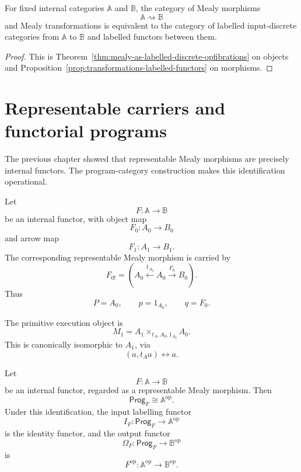 \begin{corollary}
\label{cor:mealy-hom-category-labelled-discrete}
For fixed internal categories \(\mathbb A\) and \(\mathbb B\), the category of Mealy morphisms
\[
\mathbb A\rightsquigarrow\mathbb B
\]
and Mealy transformations is equivalent to the category of labelled input-discrete categories from \(\mathbb A\) to \(\mathbb B\) and labelled functors between them.
\end{corollary}

\begin{proof}
This is Theorem~\ref{thm:mealy-as-labelled-discrete-opfibrations} on objects and Proposition~\ref{prop:transformations-labelled-functors} on morphisms.
\end{proof}

\section{Representable carriers and functorial programs}
\label{sec:representable-carriers-functorial-programs}

The previous chapter showed that representable Mealy morphisms are precisely internal functors. The program-category construction makes this identification operational.

Let
\[
F:\mathbb A\to\mathbb B
\]
be an internal functor, with object map
\[
F_0:A_0\to B_0
\]
and arrow map
\[
F_1:A_1\to B_1.
\]
The corresponding representable Mealy morphism is carried by
\[
F_{0!}
=
\left(
A_0\xleftarrow{1_{A_0}}A_0\xrightarrow{F_0}B_0
\right).
\]
Thus
\[
P=A_0,
\qquad
p=1_{A_0},
\qquad
q=F_0.
\]

The primitive execution object is
\[
M_1=A_1\times_{t_A,A_0,1_{A_0}}A_0.
\]
This is canonically isomorphic to \(A_1\), via
\[
(a,t_Aa)\longleftrightarrow a.
\]

\begin{theorem}
\label{thm:program-category-representable}
Let
\[
F:\mathbb A\to\mathbb B
\]
be an internal functor, regarded as a representable Mealy morphism. Then
\[
\mathsf{Prog}_F\cong\mathbb A^{\mathrm{op}}.
\]
Under this identification, the input labelling functor
\[
I_F:\mathsf{Prog}_F\to\mathbb A^{\mathrm{op}}
\]
is the identity functor, and the output functor
\[
\Omega_F:\mathsf{Prog}_F\to\mathbb B^{\mathrm{op}}
\]
is
\[
F^{\mathrm{op}}:\mathbb A^{\mathrm{op}}\to\mathbb B^{\mathrm{op}}.
\]
\end{theorem}


